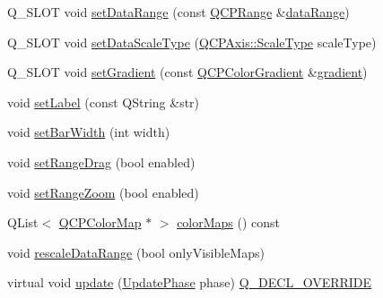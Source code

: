 \begin{DoxyCompactItemize}
\item 
Q\+\_\+\+S\+L\+OT void \hyperlink{class_q_c_p_color_scale_abe88633003a26d1e756aa74984587fef}{set\+Data\+Range} (const \hyperlink{class_q_c_p_range}{Q\+C\+P\+Range} \&\hyperlink{class_q_c_p_color_scale_a51f5756f99867bd91e570eddefeb1ef4}{data\+Range})
\item 
Q\+\_\+\+S\+L\+OT void \hyperlink{class_q_c_p_color_scale_aeb6107d67dd7325145b2498abae67fc3}{set\+Data\+Scale\+Type} (\hyperlink{class_q_c_p_axis_a36d8e8658dbaa179bf2aeb973db2d6f0}{Q\+C\+P\+Axis\+::\+Scale\+Type} scale\+Type)
\item 
Q\+\_\+\+S\+L\+OT void \hyperlink{class_q_c_p_color_scale_a1f29583bb6f1e7f473b62fb712be3940}{set\+Gradient} (const \hyperlink{class_q_c_p_color_gradient}{Q\+C\+P\+Color\+Gradient} \&\hyperlink{class_q_c_p_color_scale_a31d4e3b49461bf6b265eabd028d0f7b2}{gradient})
\item 
void \hyperlink{class_q_c_p_color_scale_aee124ae8396320cacf8276e9a0fbb8ce}{set\+Label} (const Q\+String \&str)
\item 
void \hyperlink{class_q_c_p_color_scale_ab9dcc0c1cd583477496209b1413bcb99}{set\+Bar\+Width} (int width)
\item 
void \hyperlink{class_q_c_p_color_scale_a21c51a55e4fd581b6feadca9ee5b38d5}{set\+Range\+Drag} (bool enabled)
\item 
void \hyperlink{class_q_c_p_color_scale_a96bd60fb6317ad6821841b539c93eeeb}{set\+Range\+Zoom} (bool enabled)
\item 
Q\+List$<$ \hyperlink{class_q_c_p_color_map}{Q\+C\+P\+Color\+Map} $\ast$ $>$ \hyperlink{class_q_c_p_color_scale_a556adc6b0216ebc1cc4317c541956d06}{color\+Maps} () const
\item 
void \hyperlink{class_q_c_p_color_scale_a425983db4478543924ddbd04ea20a356}{rescale\+Data\+Range} (bool only\+Visible\+Maps)
\item 
virtual void \hyperlink{class_q_c_p_color_scale_a259dcb6d3053a2cc3c197e9b1191ddbe}{update} (\hyperlink{class_q_c_p_layout_element_a0d83360e05735735aaf6d7983c56374d}{Update\+Phase} phase) \hyperlink{qcustomplot_8h_a42cc5eaeb25b85f8b52d2a4b94c56f55}{Q\+\_\+\+D\+E\+C\+L\+\_\+\+O\+V\+E\+R\+R\+I\+DE}
\end{DoxyCompactItemize}
